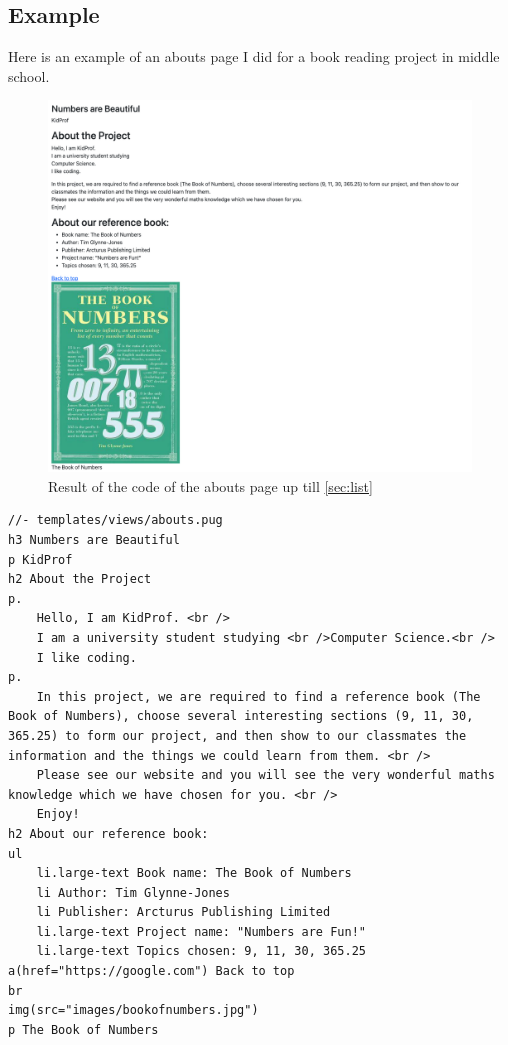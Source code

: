 \subsection*{Example}

Here is an example of an abouts page I did for a book reading project in middle school.

\begin{figure}[h]
\centering
\includegraphics[width=15cm]{images/ch5-finalproduct.png}
\caption{Result of the code of the abouts page up till \cref{sec:list}}
\end{figure}

\begin{lstlisting}[language=pug]
//- templates/views/abouts.pug
h3 Numbers are Beautiful
p KidProf
h2 About the Project
p.
    Hello, I am KidProf. <br />
	I am a university student studying <br />Computer Science.<br />
	I like coding.
p.
    In this project, we are required to find a reference book (The Book of Numbers), choose several interesting sections (9, 11, 30, 365.25) to form our project, and then show to our classmates the information and the things we could learn from them. <br />
    Please see our website and you will see the very wonderful maths knowledge which we have chosen for you. <br />
    Enjoy!
h2 About our reference book:
ul
    li.large-text Book name: The Book of Numbers
    li Author: Tim Glynne-Jones
    li Publisher: Arcturus Publishing Limited
    li.large-text Project name: "Numbers are Fun!"
    li.large-text Topics chosen: 9, 11, 30, 365.25
a(href="https://google.com") Back to top
br
img(src="images/bookofnumbers.jpg")
p The Book of Numbers
\end{lstlisting}

